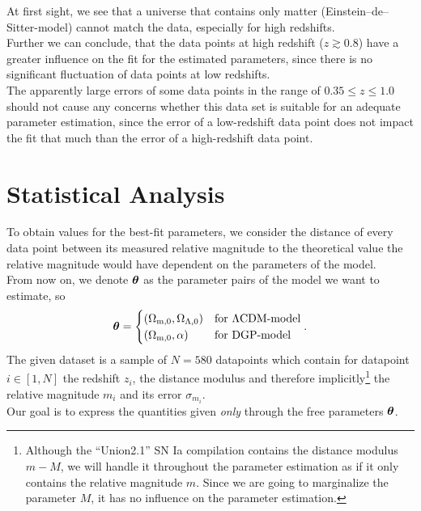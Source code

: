 \noindent At first sight, we see that a universe that contains only matter (Einstein--de--Sitter-model) cannot match the data, especially for high redshifts. \\
Further we can conclude, that the data points at high redshift ($z \gtrsim 0.8$) have a greater influence on the fit for the estimated parameters, since there is no significant fluctuation of data points at low redshifts. \\
The apparently large errors of some data points in the range of $0.35 \leq z \leq 1.0$ should not cause any concerns whether this data set is suitable for an adequate parameter estimation, since the error of a low-redshift data point does not impact the fit that much than the error of a high-redshift data point.

\section{Statistical Analysis}
To obtain values for the best-fit parameters, we consider the distance of every data point between its measured relative magnitude to the theoretical value the relative magnitude would have dependent on the parameters of the model. \\ 
From now on, we denote $\vb*{\theta}$ as the parameter pairs of the model we want to estimate, so 
\begin{align}
    \vb*{\theta} = \begin{cases}
                        (\Omega_{\text{m},0}, \Omega_{\Lambda,0}) &\text{for $\Lambda$CDM-model}\\
                        (\Omega_{\text{m},0}, \alpha)             &\text{for DGP-model}\\
                   \end{cases}.
\end{align}
The given dataset is a sample of $N = 580$ datapoints which contain for datapoint $i \in [1,N]$ the redshift $z_{i}$, the distance modulus and therefore implicitly\footnote{Although the ``Union2.1'' SN Ia compilation contains the distance modulus $m - M$, we will handle it throughout the parameter estimation as if it only contains the relative magnitude $m$. Since we are going to marginalize the parameter $M$, it has no influence on the parameter estimation.} the relative magnitude $m_{i}$ and its error $\sigma_{m_{i}}$. \\
Our goal is to express the quantities given \textit{only} through the free parameters $\vb*{\theta}$. \\
